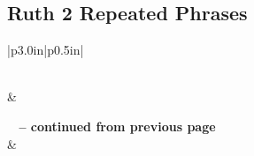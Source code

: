 \subsection{Ruth 2 Repeated Phrases}


\normalsize
 
\begin{center}
\begin{longtable}{|p{3.0in}|p{0.5in}|}
\caption[Ruth 2 Repeated Phrases]{Ruth 2 Repeated Phrases}\label{table:Repeated Phrases Ruth 2} \\
\hline {} &  \\ \hline 
\endfirsthead
 
{{\bfseries \tablename\ \thetable{} -- continued from previous page}} \\  
\hline {} &  \\ \hline 
\endhead
 

\end{longtable}
\end{center}
